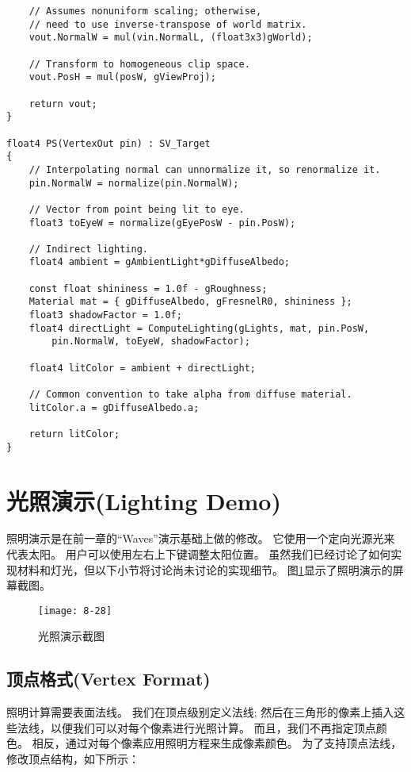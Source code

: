 \begin{lstlisting}
    // Assumes nonuniform scaling; otherwise, 
    // need to use inverse-transpose of world matrix.
    vout.NormalW = mul(vin.NormalL, (float3x3)gWorld);

    // Transform to homogeneous clip space.
    vout.PosH = mul(posW, gViewProj);

    return vout;
}

float4 PS(VertexOut pin) : SV_Target
{
    // Interpolating normal can unnormalize it, so renormalize it.
    pin.NormalW = normalize(pin.NormalW);

    // Vector from point being lit to eye. 
    float3 toEyeW = normalize(gEyePosW - pin.PosW);

    // Indirect lighting.
    float4 ambient = gAmbientLight*gDiffuseAlbedo;

    const float shininess = 1.0f - gRoughness;
    Material mat = { gDiffuseAlbedo, gFresnelR0, shininess };
    float3 shadowFactor = 1.0f;
    float4 directLight = ComputeLighting(gLights, mat, pin.PosW,
        pin.NormalW, toEyeW, shadowFactor);

    float4 litColor = ambient + directLight;

    // Common convention to take alpha from diffuse material.
    litColor.a = gDiffuseAlbedo.a;

    return litColor;
}
\end{lstlisting}

\section{光照演示(Lighting Demo)}
\begin{flushleft}
照明演示是在前一章的“Waves”演示基础上做的修改。 它使用一个定向光源光来代表太阳。 用户可以使用左右上下键调整太阳位置。 虽然我们已经讨论了如何实现材料和灯光，但以下小节将讨论尚未讨论的实现细节。 图\ref{fig:8-28}显示了照明演示的屏幕截图。
\end{flushleft}

\begin{figure}[h]
    \label{fig:8-28}
    \texttt{[image: 8-28]}
    \centering
    \caption{光照演示截图}
\end{figure}

\subsection{顶点格式(Vertex Format)}
\begin{flushleft}
照明计算需要表面法线。 我们在顶点级别定义法线; 然后在三角形的像素上插入这些法线，以便我们可以对每个像素进行光照计算。 而且，我们不再指定顶点颜色。 相反，通过对每个像素应用照明方程来生成像素颜色。 为了支持顶点法线，修改顶点结构，如下所示：\\
\end{flushleft}

